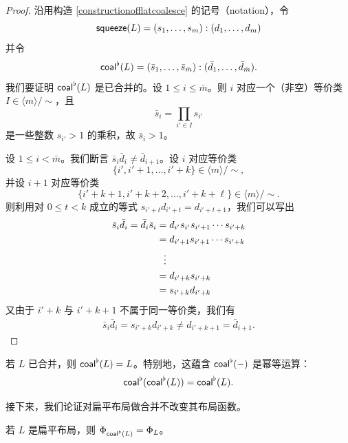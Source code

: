 \begin{proof}
沿用构造 \ref{constructionofflatcoalesce} 的记号（notation），令
    \[
    \mathsf{squeeze}(L) = (s_1,\dots,s_m):(d_1,\dots,d_m)
    \]
    并令
    \[
    \mathsf{coal}^\flat(L) = (\bar{s}_1,\dots,\bar{s}_{\bar{m}}) : ( \bar{d}_1,\dots,\bar{d}_{\bar{m}}).
    \]
    我们要证明 $\mathsf{coal}^\flat(L)$ 是已合并的。设 $1 \leq i \leq \bar{m}$。则 $i$ 对应一个（非空）等价类 $I \in \langle m \rangle / \sim$，且
    \[
    \bar{s}_i = \prod_{i' \in I} s_{i'}
    \]
    是一些整数 $s_{i'} > 1$ 的乘积，故 $\bar{s}_i >1$。

    设 $1 \leq i < \bar{m}$。我们断言 $\bar{s}_i \bar{d}_i \neq \bar{d}_{i+1}$。设 $i$ 对应等价类
    \[\{i',i' + 1 , \dots , i' + k\} \in \langle m \rangle / \sim,\] 并设 $i+1$ 对应等价类
    \[ \{i'+k+1,i'+k+2,\dots,i'+k+\ell\} \in \langle m \rangle / \sim.\]
    则利用对 $0 \leq t < k$ 成立的等式 $s_{i'+t}d_{i'+t} = d_{i'+t+1}$，我们可以写出
    \begin{align*}
        \bar{s}_i \bar{d}_i = \bar{d}_i \bar{s}_i & = d_{i'} s_{i'} s_{i' + 1 } \cdots s_{i'+k}\\
        & = d_{i'+1}s_{i'+1} \cdots s_{i'+k}\\
        & \hspace{0.08in} \vdots \\
        & = d_{i'+k} s_{i'+k}\\
        & = s_{i'+k}d_{i'+k}
    \end{align*}
    又由于 $i'+k$ 与 $i'+k+1$ 不属于同一等价类，我们有
    \begin{align*}
        \bar{s}_i\bar{d}_i = s_{i'+k}d_{i'+k} \neq d_{i'+k+1} = \bar{d}_{i+1}.
    \end{align*}
\end{proof}


\begin{example}
    若 $L$ 已合并，则 $\mathsf{coal}^\flat(L) = L$。特别地，这蕴含 $\mathsf{coal}^\flat(-)$ 是幂等运算：
    \[
    \mathsf{coal}^\flat(\mathsf{coal}^\flat(L)) = \mathsf{coal}^\flat(L).
    \]
\end{example}

接下来，我们论证对扁平布局做合并不改变其布局函数。

\begin{lemma} \label{coalescelemma}
    若 $L$ 是扁平布局，则 $\Phi_{\mathsf{coal}^\flat(L)} = \Phi_L$。
\end{lemma}

